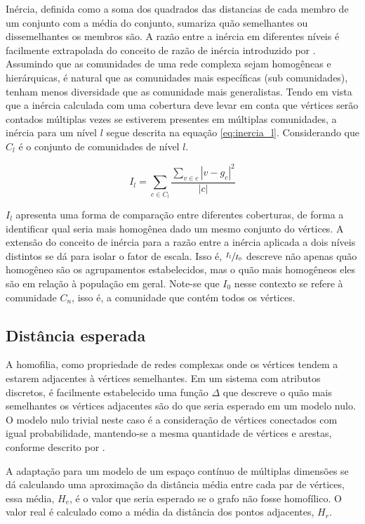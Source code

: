 \documentclass[notes.tex]{subfiles}
\begin{document}
Inércia, definida como a soma dos quadrados das distancias de cada membro de um conjunto com a média do conjunto, sumariza quão semelhantes ou dissemelhantes os membros são.
A razão entre a inércia em diferentes níveis é facilmente extrapolada do conceito de razão de inércia introduzido por .
Assumindo que as comunidades de uma rede complexa sejam homogêneas e hierárquicas, é natural que as comunidades mais específicas (sub comunidades), tenham menos diversidade que as comunidade mais generalistas.
Tendo em vista que a inércia calculada com uma cobertura deve levar em conta que vértices serão contados múltiplas vezes se estiverem presentes em múltiplas comunidades, a inércia para um nível $l$ segue descrita na equação \ref{eq:inercia_l}.
Considerando que $C_l$ é o conjunto de comunidades de nível  $l$.

\begin{equation}\label{eq:inercia_l}
    I_l = \sum_{c \in C_l}\frac{\sum_{v \in c} |v-g_c|^2}{|c|}
\end{equation}

$I_l$ apresenta uma forma de comparação entre diferentes coberturas, de forma a identificar qual seria mais homogênea dado um mesmo conjunto do vértices.
A extensão do conceito de inércia para a razão entre a inércia aplicada a dois níveis distintos se dá para isolar o fator de escala.
Isso é, $\sfrac{I_l}{I_0}$ descreve não apenas quão homogêneo são os agrupamentos estabelecidos, mas o quão mais homogêneos eles são em relação à população em geral.
Note-se que $I_0$ nesse contexto se refere à comunidade $C_n$, isso é, a comunidade que contém todos os vértices.

\subsection{Distância esperada}

A homofilia, como propriedade de redes complexas onde os vértices tendem a estarem adjacentes à vértices semelhantes.
Em um sistema com atributos discretos, é facilmente estabelecido uma função $\Delta$  que descreve o quão mais semelhantes os vértices adjacentes são do que seria esperado em um modelo nulo.
O modelo nulo trivial neste caso é a consideração de vértices conectados com igual probabilidade, mantendo-se a mesma quantidade de vértices e arestas, conforme descrito por .

A adaptação para um modelo de um espaço contínuo de múltiplas dimensões se dá calculando uma aproximação da distância média entre cada par de vértices, essa média, $H_e$, é o valor que seria esperado se o grafo não fosse homofílico.
O valor real é calculado como a média da distância dos pontos adjacentes, $H_r$.
\end{document}
